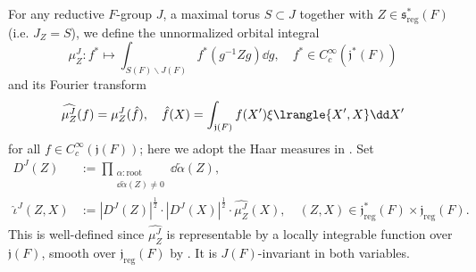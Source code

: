 \documentclass[a4paper,10pt]{article}
\begin{document}
\begin{notation}
	For any reductive $F$-group $J$, a maximal torus $S \subset J$ together with $Z \in \mathfrak{s}^*_\text{reg}(F)$ (i.e. $J_Z = S$), we define the unnormalized orbital integral
	\[ \mu^J_Z: f^* \longmapsto \int_{S(F) \backslash J(F)} f^*(g^{-1} Z g) \dd g, \quad f^* \in C^\infty_c(\mathfrak{j}^*(F)) \]
	and its Fourier transform
	\[ \widehat{\mu^J_Z}(f) = \mu^J_Z(\hat{f}), \quad \hat{f}(X) = \int_{\mathfrak{j}(F)} f(X') \xi\lrangle{X', X} \dd X' \]
	for all $f \in C^\infty_c(\mathfrak{j}(F))$; here we adopt the Haar measures in \cite[\S 4.2]{Kal16}. Set
	\begin{align*}
		D^J(Z) & := \prod_{\substack{\alpha: \text{root} \\ \dd\check{\alpha}(Z) \neq 0 }} \dd\check{\alpha}(Z), \\
		\hat{\iota}^J(Z,X) & := |D^J(Z)|^{\frac{1}{2}} \cdot |D^J(X)|^{\frac{1}{2}} \cdot \widehat{\mu^J_Z}(X), \quad (Z, X) \in \mathfrak{j}^*_\text{reg}(F) \times \mathfrak{j}_\text{reg}(F).
	\end{align*}
	This is well-defined since $\widehat{\mu^J_Z}$ is representable by a locally integrable function over $\mathfrak{j}(F)$, smooth over $\mathfrak{j}_\text{reg}(F)$ by \cite{HC99}. It is $J(F)$-invariant in both variables.
\end{notation}
\end{document}
